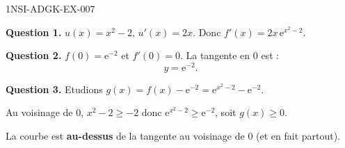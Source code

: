 \begin{corrige}{1NSI-ADGK-EX-007}

\textbf{Question 1.} $u(x) = x^2-2$, $u'(x) = 2x$. Donc $f'(x) = 2x\,\mathrm{e}^{x^2-2}$.


\textbf{Question 2.} $f(0) = \mathrm{e}^{-2}$ et $f'(0) = 0$. La tangente en $0$ est :
\[ y = \mathrm{e}^{-2}. \]

\textbf{Question 3.} Etudions $g(x) = f(x) - \mathrm{e}^{-2} = \mathrm{e}^{x^2-2} - \mathrm{e}^{-2}$.

Au voisinage de $0$, $x^2-2 \geq -2$ donc $\mathrm{e}^{x^2-2} \geq \mathrm{e}^{-2}$, soit $g(x) \geq 0$.

La courbe est \textbf{au-dessus} de la tangente au voisinage de $0$ (et en fait partout).

\end{corrige}
